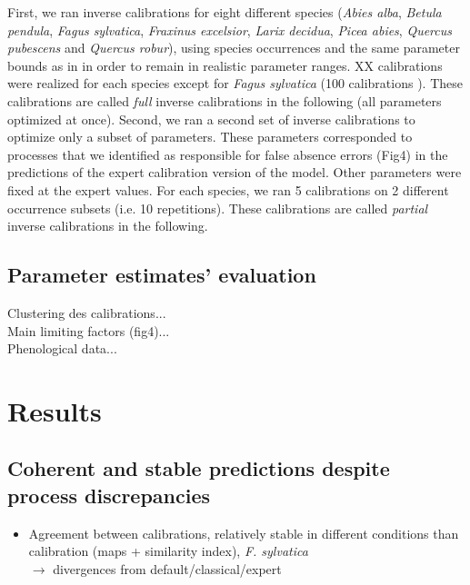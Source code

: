 \documentclass[letterpaper,8pt]{extarticle}  %
\begin{document}
\begin{doublespacing}
\begin{linenumbers}
 First, we ran inverse calibrations for eight different species (\emph{Abies alba}, \emph{Betula pendula}, \emph{Fagus sylvatica}, \emph{Fraxinus excelsior}, \emph{Larix decidua}, \emph{Picea abies}, \emph{Quercus pubescens} and \emph{Quercus robur}), using species occurrences and the same parameter bounds as in \citet{VanderMeersch2023} in order to remain in realistic parameter ranges. XX calibrations were realized for each species except for \textit{Fagus sylvatica} (100 calibrations  \citet{VanderMeersch2023}). These calibrations are called \emph{full} inverse calibrations in the following (all parameters optimized at once). Second, we ran a second set of inverse calibrations to optimize only a subset of parameters. These parameters corresponded to processes that we identified as responsible for false absence errors (Fig4) in the predictions of the expert calibration version of the model. Other parameters were fixed at the expert values. For each species, we ran 5 calibrations on 2 different occurrence subsets (i.e. 10 repetitions). These calibrations are called \emph{partial} inverse calibrations in the following. 

\subsection{Parameter estimates' evaluation}

Clustering des calibrations...\\
Main limiting factors (fig4)...\\
Phenological data...

\section{Results}

\subsection{Coherent and stable predictions despite process discrepancies}

\begin{itemize}

\item Agreement between calibrations, relatively stable in different conditions than calibration (maps + similarity index), \emph{F. sylvatica}\\
$\rightarrow$ divergences from default/classical/expert


\end{itemize}
\end{linenumbers}
\end{doublespacing}
\end{document}
